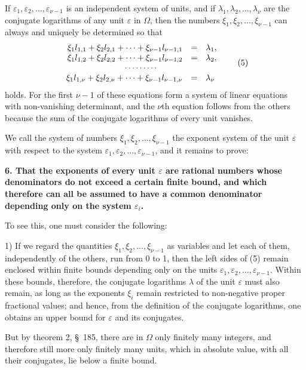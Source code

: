 \documentclass[11pt]{article}
\begin{document}
If $\varepsilon_1,\varepsilon_2,\ldots,\varepsilon_{\nu-1}$ is an independent system of units, and if $\lambda_1,\lambda_2,\ldots,\lambda_\nu$ are the conjugate logarithms of any unit $\varepsilon$ in $\Omega$, then the numbers $\xi_1,\xi_2,\ldots,\xi_{\nu-1}$ can always and uniquely be determined so that
\begin{equation}
\begin{array}{rcl}
\xi_1l_{1,1}+\xi_2l_{2,1}+\cdots+\xi_{\nu-1}l_{\nu-1,1}&=&\lambda_1,\\
\xi_1l_{1,2}+\xi_2l_{2,2}+\cdots+\xi_{\nu-1}l_{\nu-1,2}&=&\lambda_2,\\
\multicolumn{3}{c}{\cdots\cdots\cdots}\,\\
\xi_1l_{1,\nu}+\xi_2l_{2,\nu}+\cdots+\xi_{\nu-1}l_{\nu-1,\nu}&=&\lambda_\nu
\end{array}
\tag{5}
\end{equation}
holds. For the first $\nu-1$ of these equations form a system of linear equations with non-vanishing determinant, and the $\nu$th equation follows from the others because the sum of the conjugate logarithms of every unit vanishes.

We call the system of numbers $\xi_1,\xi_2,\ldots,\xi_{\nu-1}$ the exponent system of the unit $\varepsilon$ with respect to the system $\varepsilon_1,\varepsilon_2,\ldots,\varepsilon_{\nu-1}$, and it remains to prove:

\textbf{6. That the exponents of every unit $\varepsilon$ are rational numbers whose denominators do not exceed a certain finite bound, and which therefore can all be assumed to have a common denominator depending only on the system $\varepsilon_i$.}

To see this, one must consider the following:

1) If we regard the quantities $\xi_1,\xi_2,\ldots,\xi_{\nu-1}$ as variables and let each of them, independently of the others, run from 0 to 1, then the left sides of (5) remain enclosed within finite bounds depending only on the units $\varepsilon_1,\varepsilon_2,\ldots,\varepsilon_{\nu-1}$. Within these bounds, therefore, the conjugate logarithms $\lambda$ of the unit $\varepsilon$ must also remain, as long as
the exponents $\xi_i$ remain restricted to non-negative proper fractional values; and hence, from the definition of the conjugate logarithms, one obtains an upper bound for $\varepsilon$ and its conjugates.

But by theorem 2, \S~185, there are in $\Omega$ only finitely many integers, and therefore still more only finitely many units, which in absolute value, with all their conjugates, lie below a finite bound.
\end{document}
